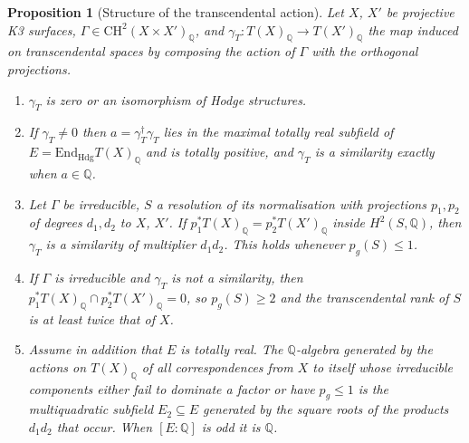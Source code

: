 \documentclass[11pt,reqno]{amsart}
\numberwithin{equation}{section}
\theoremstyle{plain}
\newtheorem{proposition}[theorem]{Proposition}
\theoremstyle{definition}
\newcommand{\QQ}{\mathbb{Q}}
\newcommand{\Hdg}{\mathrm{Hdg}}
\newcommand{\End}{\mathrm{End}}
\begin{document}
\begin{proposition}[Structure of the transcendental action]\label{prop:structure}
Let $X$, $X'$ be projective K3 surfaces, $\Gamma\in\mathrm{CH}^{2}(X\times X')_{\QQ}$, and $\gamma_{T}\colon T(X)_{\QQ}\to T(X')_{\QQ}$ the map induced on transcendental spaces by composing the action of $\Gamma$ with the orthogonal projections.
\begin{enumerate}[label=\textup{(\roman*)},leftmargin=2.4em,itemsep=2pt]
\item $\gamma_{T}$ is zero or an isomorphism of Hodge structures.
\item If $\gamma_{T}\ne0$ then $a=\gamma_{T}^{\dagger}\gamma_{T}$ lies in the maximal totally real subfield of $E=\End_{\Hdg}T(X)_{\QQ}$ and is totally positive, and $\gamma_{T}$ is a similarity exactly when $a\in\QQ$.
\item Let $\Gamma$ be irreducible, $S$ a resolution of its normalisation with projections $p_{1},p_{2}$ of degrees $d_{1},d_{2}$ to $X$, $X'$. If $p_{1}^{*}T(X)_{\QQ}=p_{2}^{*}T(X')_{\QQ}$ inside $H^{2}(S,\QQ)$, then $\gamma_{T}$ is a similarity of multiplier $d_{1}d_{2}$. This holds whenever $p_{g}(S)\le1$.
\item If $\Gamma$ is irreducible and $\gamma_{T}$ is not a similarity, then $p_{1}^{*}T(X)_{\QQ}\cap p_{2}^{*}T(X')_{\QQ}=0$, so $p_{g}(S)\ge2$ and the transcendental rank of $S$ is at least twice that of $X$.
\item Assume in addition that $E$ is totally real. The $\QQ$-algebra generated by the actions on $T(X)_{\QQ}$ of all correspondences from $X$ to itself whose irreducible components either fail to dominate a factor or have $p_{g}\le1$ is the multiquadratic subfield $E_{2}\subseteq E$ generated by the square roots of the products $d_{1}d_{2}$ that occur. When $[E:\QQ]$ is odd it is $\QQ$.
\end{enumerate}
\end{proposition}
\end{document}
